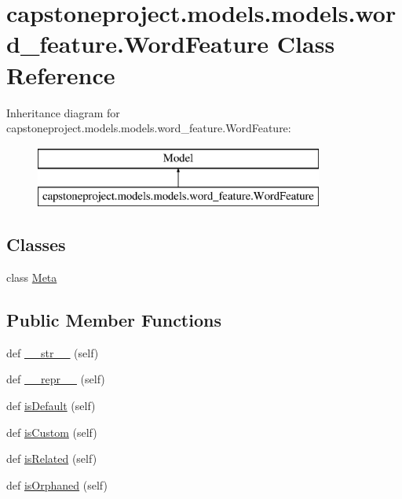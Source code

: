 \hypertarget{classcapstoneproject_1_1models_1_1models_1_1word__feature_1_1_word_feature}{}\section{capstoneproject.\+models.\+models.\+word\+\_\+feature.\+Word\+Feature Class Reference}
\label{classcapstoneproject_1_1models_1_1models_1_1word__feature_1_1_word_feature}
Inheritance diagram for capstoneproject.\+models.\+models.\+word\+\_\+feature.\+Word\+Feature\+:\begin{figure}[H]
\begin{center}
\leavevmode
\includegraphics[height=2.000000cm]{classcapstoneproject_1_1models_1_1models_1_1word__feature_1_1_word_feature}
\end{center}
\end{figure}
\subsection*{Classes}
\begin{DoxyCompactItemize}
\item 
class \mbox{\hyperlink{classcapstoneproject_1_1models_1_1models_1_1word__feature_1_1_word_feature_1_1_meta}{Meta}}
\end{DoxyCompactItemize}
\subsection*{Public Member Functions}
\begin{DoxyCompactItemize}
\item 
def \mbox{\hyperlink{classcapstoneproject_1_1models_1_1models_1_1word__feature_1_1_word_feature_a7958d193c27a7a29b4c2a50449e4c684}{\+\_\+\+\_\+str\+\_\+\+\_\+}} (self)
\item 
def \mbox{\hyperlink{classcapstoneproject_1_1models_1_1models_1_1word__feature_1_1_word_feature_af99c1847059bda966cfb12d993bc7ea4}{\+\_\+\+\_\+repr\+\_\+\+\_\+}} (self)
\item 
def \mbox{\hyperlink{classcapstoneproject_1_1models_1_1models_1_1word__feature_1_1_word_feature_a624fac727ff19ea4daacdff8805ec330}{is\+Default}} (self)
\item 
def \mbox{\hyperlink{classcapstoneproject_1_1models_1_1models_1_1word__feature_1_1_word_feature_a10d3be79e0f76c42d78596dc53003b95}{is\+Custom}} (self)
\item 
def \mbox{\hyperlink{classcapstoneproject_1_1models_1_1models_1_1word__feature_1_1_word_feature_afc9a2a8451d268203ed867c2b74d6270}{is\+Related}} (self)
\item 
def \mbox{\hyperlink{classcapstoneproject_1_1models_1_1models_1_1word__feature_1_1_word_feature_a89b3f6f2100b248042e05519651fe1ae}{is\+Orphaned}} (self)
\end{DoxyCompactItemize}

